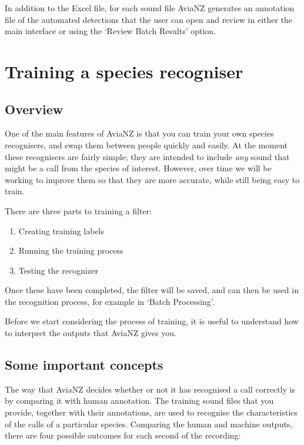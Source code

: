 \documentclass{article}
\begin{document}
In addition to the Excel file, for each sound file AviaNZ generates an annotation file of the automated detections that  the user can open and review in either the main interface or using the `Review Batch Results' option. 

\section{Training a species recogniser}\label{sec:trainfilter}

\subsection{Overview}

One of the main features of AviaNZ is that you can train your own species recognisers, and swap them between people quickly and easily. At the moment these recognisers are fairly simple; they are intended to include {\em any} sound that might be a call from the species of interest. However, over time we will be working to improve them so that they are more accurate, while still being easy to train. 

There are three parts to training a filter:

\begin{enumerate}
\item Creating training labels
\item Running the training process
\item Testing the recognizer
\end{enumerate}

Once these have been completed, the filter will be saved, and can then be used in the recognition process, for example in `Batch Processing'. 

Before we start considering the process of training, it is useful to understand how to interpret the outputs that AviaNZ gives you. 

\subsection{Some important concepts}\label{sec:metrics}

The way that AviaNZ decides whether or not it has recognised a call correctly is by comparing it with human annotation. The training sound files that you provide, together with their annotations, are used to recognise the characteristics of the calls of a particular species. Comparing the human and machine outputs, there are four possible outcomes for each second of the recording:
\end{document}
